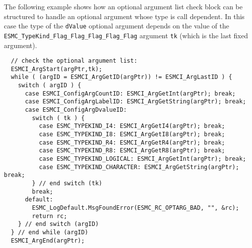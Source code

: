 \noindent
The following example shows how an optional argument list check block can be
structured to handle an optional argument whose type is call dependent. In this
case the type of the \texttt{dValue} optional argument depends on the value of the
\texttt{ESMC\_TypeKind\_Flag\_Flag\_Flag\_Flag\_Flag} argument \texttt{tk} (which is the last fixed argument).
\begin{verbatim}
  // check the optional argument list:
  ESMCI_ArgStart(argPtr,tk);
  while ( (argID = ESMCI_ArgGetID(argPtr)) != ESMCI_ArgLastID ) {
    switch ( argID ) {
      case ESMCI_ConfigArgCountID: ESMCI_ArgGetInt(argPtr); break;
      case ESMCI_ConfigArgLabelID: ESMCI_ArgGetString(argPtr); break;
      case ESMCI_ConfigArgDvalueID:
        switch ( tk ) {
          case ESMC_TYPEKIND_I4: ESMCI_ArgGetI4(argPtr); break;
          case ESMC_TYPEKIND_I8: ESMCI_ArgGetI8(argPtr); break;
          case ESMC_TYPEKIND_R4: ESMCI_ArgGetR4(argPtr); break;
          case ESMC_TYPEKIND_R8: ESMCI_ArgGetR8(argPtr); break;
          case ESMC_TYPEKIND_LOGICAL: ESMCI_ArgGetInt(argPtr); break;
          case ESMC_TYPEKIND_CHARACTER: ESMCI_ArgGetString(argPtr); break;
        } // end switch (tk)
        break;
      default:
        ESMC_LogDefault.MsgFoundError(ESMC_RC_OPTARG_BAD, "", &rc);
        return rc;
    } // end switch (argID)
  } // end while (argID)
  ESMCI_ArgEnd(argPtr);
\end{verbatim}



